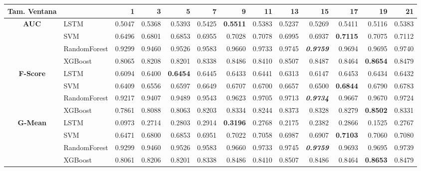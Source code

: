 \begin{table}[H]
	\centering
	\begin{adjustbox}{max width=12cm}
		\begin{tabular}{|c|l|r|r|r|r|r|r|r|r|r|r|r|}
			\hline
			\textbf{Tam. Ventana}&         &      1  &      3  &      5  &      7  &      9  &      11 &      13 &      15 &      17 &      19 &      21 \\
			\hline
			\textbf{AUC}&  LSTM &  0.5047 &  0.5368 &  0.5393 &  0.5425 & \textbf{  0.5511 } &  0.5383 &  0.5237 &  0.5269 &  0.5411 &  0.5116 &  0.5383 \\
			&  SVM &  0.6496 &  0.6801 &  0.6853 &  0.6955 &  0.7028 &  0.7078 &  0.6995 &  0.6937 & \textbf{  0.7115 } &  0.7075 &  0.7112 \\
			&  RandomForest &  0.9299 &  0.9460 &  0.9526 &  0.9583 &  0.9660 &  0.9733 &  0.9745 & \textit{ \textbf{  0.9759 } } &  0.9694 &  0.9695 &  0.9740 \\
			&  XGBoost &  0.8065 &  0.8208 &  0.8201 &  0.8338 &  0.8486 &  0.8410 &  0.8507 &  0.8487 &  0.8464 & \textbf{  0.8654 } &  0.8479 \\
			\hline
			\textbf{F-Score} &  LSTM &  0.6094 &  0.6400 & \textbf{  0.6454 } &  0.6445 &  0.6433 &  0.6441 &  0.6313 &  0.6147 &  0.6453 &  0.6434 &  0.6432 \\
			&  SVM &  0.6409 &  0.6556 &  0.6597 &  0.6649 &  0.6707 &  0.6700 &  0.6657 &  0.6500 & \textbf{  0.6844 } &  0.6790 &  0.6783 \\
			&  RandomForest &  0.9217 &  0.9407 &  0.9489 &  0.9543 &  0.9623 &  0.9705 &  0.9713 & \textit{ \textbf{  0.9734 } } &  0.9667 &  0.9670 &  0.9724 \\
			&  XGBoost &  0.7861 &  0.8088 &  0.8063 &  0.8203 &  0.8334 &  0.8244 &  0.8373 &  0.8328 &  0.8279 & \textbf{  0.8502 } &  0.8331 \\			
			\hline
			\textbf{G-Mean} &  LSTM &  0.0973 &  0.2714 &  0.2803 &  0.2914 & \textbf{  0.3196 } &  0.2768 &  0.2175 &  0.2382 &  0.2866 &  0.1525 &  0.2767 \\
			&  SVM &  0.6471 &  0.6800 &  0.6853 &  0.6951 &  0.7022 &  0.7058 &  0.6987 &  0.6907 & \textbf{  0.7103 } &  0.7060 &  0.7080 \\
			&  RandomForest &  0.9299 &  0.9460 &  0.9526 &  0.9583 &  0.9660 &  0.9733 &  0.9745 & \textit{ \textbf{  0.9759 } } &  0.9693 &  0.9695 &  0.9739 \\
			&  XGBoost &  0.8061 &  0.8206 &  0.8201 &  0.8338 &  0.8486 &  0.8410 &  0.8507 &  0.8486 &  0.8464 & \textbf{  0.8653 } &  0.8479 \\			

\end{tabular}
\end{adjustbox}
\end{table}
